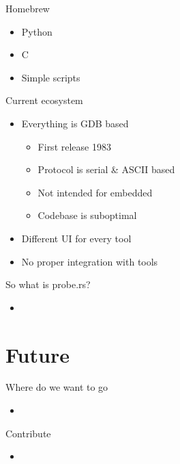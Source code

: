 \documentclass[aspectratio=1610,14pt,t]{beamer}
\begin{document}
\begin{frame}[c]{Homebrew}
  \begin{itemize}
    \item Python
    \item C
    \item Simple scripts
  \end{itemize}
\end{frame}

\begin{frame}[c]{Current ecosystem}
  \begin{itemize}
    \item Everything is GDB based
      \begin{itemize}
        \item First release 1983
        \item Protocol is serial \& ASCII based
        \item Not intended for embedded
        \item Codebase is suboptimal
      \end{itemize}
    \item Different UI for every tool
    \item No proper integration with tools
  \end{itemize}
\end{frame}

\begin{frame}[c]{So what is probe.rs?}
  \begin{itemize}
    \item
  \end{itemize}
\end{frame}

\section{Future}

\begin{frame}[c]{Where do we want to go}
  \begin{itemize}
    \item
  \end{itemize}
\end{frame}

\begin{frame}[c]{Contribute}
  \begin{itemize}
    \item
  \end{itemize}
\end{frame}
\end{document}

